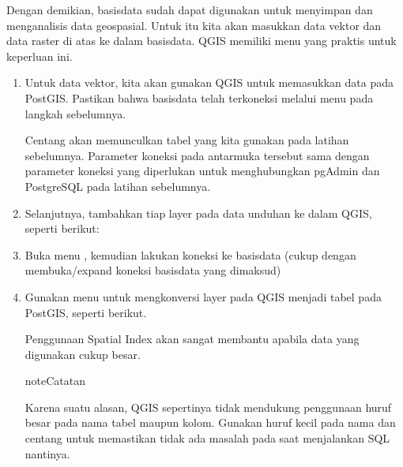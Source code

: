 \documentclass[letterpaper,10pt,english]{sphinxmanual}
\begin{document}
Dengan demikian, basisdata  sudah dapat digunakan untuk menyimpan dan menganalisis data geospasial. Untuk itu kita akan masukkan data vektor dan data raster di atas ke dalam basisdata. QGIS memiliki menu yang praktis untuk keperluan ini.
\begin{enumerate}
%
\item {} 
Untuk data vektor, kita akan gunakan QGIS untuk memasukkan data pada PostGIS. Pastikan bahwa basisdata telah terkoneksi melalui menu  pada langkah sebelumnya.


Centang  akan memunculkan tabel  yang kita gunakan pada latihan sebelumnya.    Parameter koneksi pada antarmuka tersebut sama dengan parameter koneksi yang diperlukan untuk menghubungkan pgAdmin dan PostgreSQL pada latihan sebelumnya.

\item {} 
Selanjutnya, tambahkan tiap layer  pada data unduhan ke dalam QGIS, seperti berikut:


\item {} 
Buka menu , kemudian lakukan koneksi ke basisdata (cukup dengan membuka/expand koneksi basisdata yang dimaksud)


\item {} 
Gunakan menu  untuk mengkonversi layer pada QGIS menjadi tabel pada PostGIS, seperti berikut.


Penggunaan Spatial Index akan sangat membantu apabila data yang digunakan cukup besar.

\begin{sphinxadmonition}{note}{Catatan}

Karena suatu alasan, QGIS sepertinya tidak mendukung penggunaan huruf besar pada nama tabel maupun kolom. Gunakan huruf kecil pada nama  dan centang  untuk memastikan tidak ada masalah pada saat menjalankan SQL nantinya.
\end{sphinxadmonition}


\end{enumerate}
\end{document}
